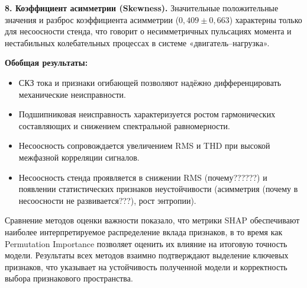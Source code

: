 \textbf{8. Коэффициент асимметрии (Skewness).}
Значительные положительные значения и разброс коэффициента асимметрии ($0{,}409 \pm 0{,}663$) характерны только для несоосности стенда, что говорит о несимметричных пульсациях момента и нестабильных колебательных процессах в системе «двигатель–нагрузка».

\bigskip
\textbf{Обобщая результаты:}
\begin{itemize}
    \item СКЗ тока и признаки огибающей позволяют надёжно дифференцировать механические неисправности.
    \item Подшипниковая неисправность характеризуется ростом гармонических составляющих и снижением спектральной равномерности.
    \item Несоосность сопровождается увеличением RMS и THD при высокой межфазной корреляции сигналов.
    \item Несоосность стенда проявляется в снижении RMS (почему??????) и появлении статистических признаков неустойчивости (асимметрия (почему в несоосности не развивается???), рост энтропии).
\end{itemize}


Сравнение методов оценки важности показало, что метрики SHAP обеспечивают наиболее интерпретируемое распределение вклада признаков, в то время как Permutation Importance позволяет оценить их влияние на итоговую точность модели.  
Результаты всех методов взаимно подтверждают выделение ключевых признаков, что указывает на устойчивость полученной модели и корректность выбора признакового пространства.
